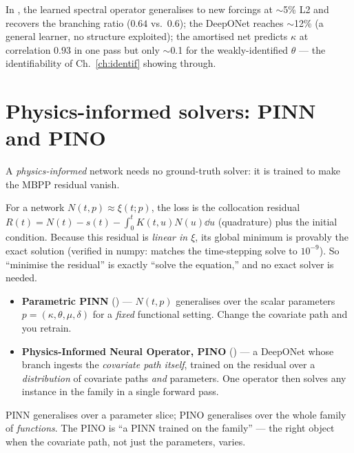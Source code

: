 \begin{examplebox}
In , the learned spectral operator generalises to new forcings at
$\sim$5\% L2 and recovers the branching ratio ($0.64$ vs.\ $0.6$); the DeepONet
reaches $\sim$12\% (a general learner, no structure exploited); the amortised net
predicts $\kappa$ at correlation $0.93$ in one pass but only $\sim$0.1 for the
weakly-identified $\theta$ --- the identifiability of Ch.~\ref{ch:identif} showing
through.
\end{examplebox}

\section{Physics-informed solvers: PINN and PINO}

A \emph{physics-informed} network needs no ground-truth solver: it is trained to
make the MBPP residual vanish.

\begin{whybox}
For a network $N(t,p)\approx\xi(t;p)$, the loss is the collocation residual
$R(t)=N(t)-s(t)-\int_0^t K(t,u)N(u)\dd u$ (quadrature) plus the initial condition.
Because this residual is \emph{linear in $\xi$}, its global minimum is provably the
exact solution (verified in numpy:  matches the
time-stepping solve to $10^{-9}$). So ``minimise the residual'' is exactly ``solve
the equation,'' and no exact solver is needed.
\end{whybox}

\begin{itemize}[leftmargin=1.4em]
\item \textbf{Parametric PINN} () --- $N(t,p)$ generalises over the
scalar parameters $p=(\kappa,\theta,\mu,\delta)$ for a \emph{fixed} functional
setting. Change the covariate path and you retrain.
\item \textbf{Physics-Informed Neural Operator, PINO} () --- a
DeepONet whose branch ingests the \emph{covariate path itself}, trained on the
residual over a \emph{distribution} of covariate paths \emph{and} parameters. One
operator then solves any instance in the family in a single forward pass.
\end{itemize}

\begin{intuitionbox}
PINN generalises over a parameter slice; PINO generalises over the whole family of
\emph{functions}. The PINO is ``a PINN trained on the family'' --- the right object
when the covariate path, not just the parameters, varies.
\end{intuitionbox}

